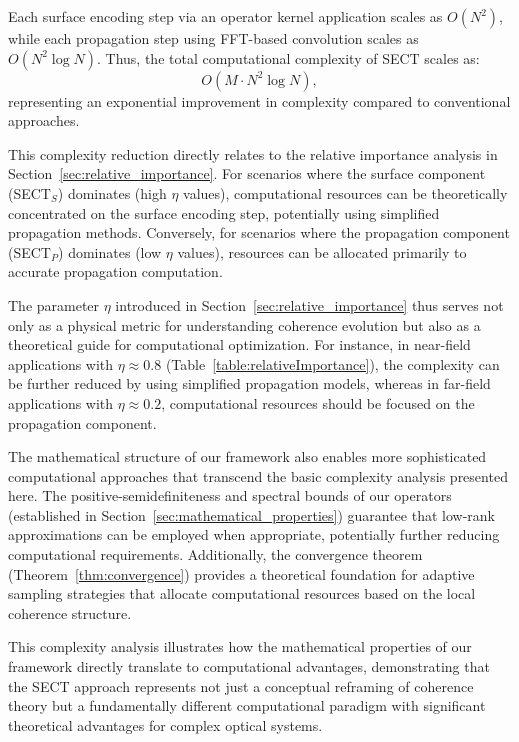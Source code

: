 \documentclass[a4paper,12pt]{article}
\begin{document}
Each surface encoding step via an operator kernel application scales as $O(N^2)$, while each propagation step using FFT-based convolution scales as $O(N^2 \log N)$. Thus, the total computational complexity of SECT scales as:
\begin{equation}
O\left(M \cdot N^2 \log N \right),
\end{equation}
representing an exponential improvement in complexity compared to conventional approaches.

This complexity reduction directly relates to the relative importance analysis in Section~\ref{sec:relative_importance}. For scenarios where the surface component (SECT$_S$) dominates (high $\eta$ values), computational resources can be theoretically concentrated on the surface encoding step, potentially using simplified propagation methods. Conversely, for scenarios where the propagation component (SECT$_P$) dominates (low $\eta$ values), resources can be allocated primarily to accurate propagation computation.

The parameter $\eta$ introduced in Section~\ref{sec:relative_importance} thus serves not only as a physical metric for understanding coherence evolution but also as a theoretical guide for computational optimization. For instance, in near-field applications with $\eta \approx 0.8$ (Table~\ref{table:relativeImportance}), the complexity can be further reduced by using simplified propagation models, whereas in far-field applications with $\eta \approx 0.2$, computational resources should be focused on the propagation component.

The mathematical structure of our framework also enables more sophisticated computational approaches that transcend the basic complexity analysis presented here. The positive-semidefiniteness and spectral bounds of our operators (established in Section~\ref{sec:mathematical_properties}) guarantee that low-rank approximations can be employed when appropriate, potentially further reducing computational requirements. Additionally, the convergence theorem (Theorem~\ref{thm:convergence}) provides a theoretical foundation for adaptive sampling strategies that allocate computational resources based on the local coherence structure.

This complexity analysis illustrates how the mathematical properties of our framework directly translate to computational advantages, demonstrating that the SECT approach represents not just a conceptual reframing of coherence theory but a fundamentally different computational paradigm with significant theoretical advantages for complex optical systems.
\end{document}
